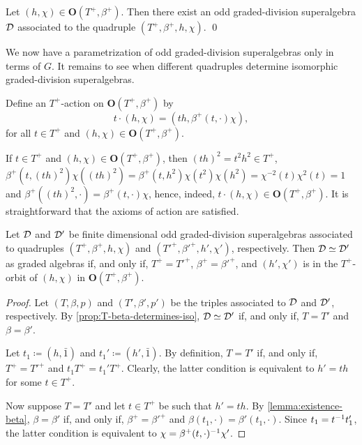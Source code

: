 \begin{prop}\label{prop:D-defined-by-quadruple}
    Let $(h, \chi) \in \mathbf{O}(T^+, \beta^+)$. 
    Then there exist an odd graded-division superalgebra $\mathcal{D}$ associated to the quadruple $(T^+, \beta^+, h,\chi)$. \qed
\end{prop}

We now have a parametrization of odd graded-division superalgebras only in terms of $G$. 
It remains to see when different quadruples determine isomorphic graded-division superalgebras. 

\begin{defi}\label{def:T^+-action}
    Define an $T^+$-action on $\mathbf{O} (T^+, \beta^+)$ by
    \[
        t \cdot (h, \chi) = (th, \beta^+(t, \cdot) \chi),
    \]
    for all $t\in T^+$ and $(h, \chi) \in \mathbf{O} (T^+, \beta^+)$.
\end{defi}

If $t\in T^+$ and $(h, \chi) \in \mathbf {O} (T^+, \beta^+)$, then $(th)^2 = t^2h^2\in T^+$, $\beta^+(t, (t h)^2) \chi( (t h)^2) = \beta^+(t, h^2) \chi(t^2) \chi (h^2) = \chi^{-2}(t) \chi
^2 (t) = 1$ and $\beta^+((th)^2, \cdot) = \beta^+(t, \cdot) \chi$, hence, indeed, $t \cdot (h, \chi) \in \mathbf {O} (T^+, \beta^+)$. 
It is straightforward that the axioms of action are satisfied. 

\begin{thm}\label{thm:iso-odd-D-only-G}
    Let $\mathcal{D}$ and $\mathcal{D}'$ be finite dimensional odd graded-division superalgebras associated to quadruples $(T^+, \beta^+, h, \chi)$ and $(T'^+, \beta'^+, h', \chi')$, respectively. 
    Then $\mathcal{D} \simeq \mathcal{D}'$ as graded algebras if, and only if, $T^+ = T'^+$, $\beta^+ = \beta'^+$, and $(h', \chi')$ is in the $T^+$-orbit of $(h, \chi)$ in $\mathbf {O} (T^+, \beta^+)$. 
\end{thm}

\begin{proof}
    Let $(T, \beta, p)$ and $(T', \beta', p')$ be the triples associated to $\mathcal{D}$ and $\mathcal{D}'$, respectively. 
    By \cref{prop:T-beta-determines-iso}, $\mathcal{D} \simeq \mathcal{D}'$ if, and only if, $T= T'$ and $\beta = \beta'$. 
    
    Let $t_1 \coloneqq (h, \bar 1)$ and $t_1' \coloneqq (h', \bar 1)$.
    By definition, $T= T'$ if, and only if, $T^+ = T'^+$ and $t_1 T^+ = t_1' T^+$. 
    Clearly, the latter condition is equivalent to 
    $h' = th$ for some $t\in T^+$. 
    
    Now suppose $T= T'$ and let $t\in T^+$ be such that $h' = th$. 
    By \cref{lemma:existence-beta}, $\beta = \beta'$ if, and only if, 
    $\beta^+ = \beta'^+$ and $\beta(t_1, \cdot) = \beta'(t_1, \cdot)$. 
    Since $t_1 = t^{-1} t_1'$, the latter condition is equivalent to $\chi = \beta^+ (t, \cdot)^{-1} \chi'$. 
\end{proof}

